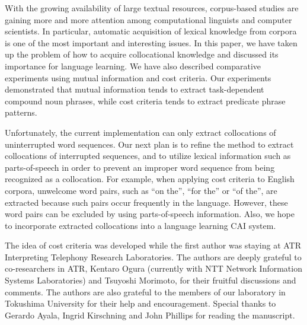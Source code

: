 With the growing availability of large textual resources,
corpus-based studies are gaining more and more attention among computational linguists
and computer scientists.
In particular, automatic acquisition of lexical knowledge from corpora
is one of the most important and interesting issues.
In this paper, we have taken up the problem of how to acquire collocational knowledge
and discussed its importance for language learning.
We have also described comparative experiments
using mutual information and cost criteria.
Our experiments demonstrated that
mutual information tends to
extract task-dependent compound noun phrases,
while cost criteria tends to extract predicate phrase patterns.

Unfortunately,
the current implementation can only extract collocations
of uninterrupted word sequences.
Our next plan is to refine the method to extract collocations
of interrupted sequences,
and to utilize lexical information such as parts-of-speech
in order to prevent an improper word sequence
from being recognized as a collocation.
For example, when applying cost criteria to English corpora,
unwelcome word pairs, such as ``on the'', ``for the'' or ``of the'',
are extracted
because such pairs occur frequently in the language.
However, these word pairs can be excluded by using
parts-of-speech information.
Also, we hope to incorporate extracted collocations
into a language learning CAI system.

\vspace*{2mm}

\acknowledgment
{
The idea of cost criteria was developed
while the first author was staying at
ATR Interpreting Telephony Research Laboratories.
The authors are deeply grateful to co-researchers in ATR,
Kentaro Ogura
(currently with NTT Network Information Systems Laboratories)
and Tsuyoshi Morimoto,
for their fruitful discussions and comments.
The authors are also grateful to
the members of our laboratory in Tokushima University
for their help and encouragement.
Special thanks to Gerardo Ayala, Ingrid Kirschning
and John Phillips
for reading the manuscript.
}





\clearpage

